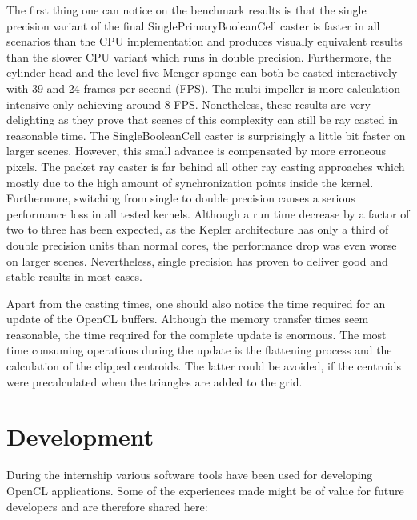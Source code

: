 The first thing one can notice on the benchmark results is that the single precision variant of the final SinglePrimaryBooleanCell caster is faster in all scenarios than the CPU implementation and produces visually equivalent results than the slower CPU variant which runs in double precision. Furthermore, the cylinder head and the level five Menger sponge can both be casted interactively with 39 and 24 frames per second (FPS). The multi impeller is more calculation intensive only achieving around 8 FPS. Nonetheless, these results are very delighting as they prove that scenes of this complexity can still be ray casted in reasonable time. The SingleBooleanCell caster is surprisingly a little bit faster on larger scenes. However, this small advance is compensated by more erroneous pixels. The packet ray caster is far behind all other ray casting approaches which mostly due to the high amount of synchronization points inside the kernel. Furthermore, switching from single to double precision causes a serious performance loss in all tested kernels. Although a run time decrease by a factor of two to three has been expected, as the Kepler architecture has only a third of double precision units than normal cores, the performance drop was even worse on larger scenes. Nevertheless, single precision has proven to deliver good and stable results in most cases.

\pagebreak

Apart from the casting times, one should also notice the time required for an update of the OpenCL buffers. Although the memory transfer times seem reasonable, the time required for the complete update is enormous. The most time consuming operations during the update is the flattening process and the calculation of the clipped centroids. The latter could be avoided, if the centroids were precalculated when the triangles are added to the grid.

\section{Development}

During the internship various software tools have been used for developing OpenCL applications. Some of the experiences made might be of value for future developers and are therefore shared here:


